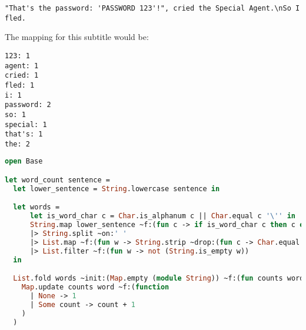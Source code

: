 \begin{verbatim}
"That's the password: 'PASSWORD 123'!", cried the Special Agent.\nSo I fled.
\end{verbatim}

The mapping for this subtitle would be:

\begin{verbatim}
123: 1
agent: 1
cried: 1
fled: 1
i: 1
password: 2
so: 1
special: 1
that's: 1
the: 2
\end{verbatim}

\begin{lstlisting}[language=OCaml]
open Base

let word_count sentence =
  let lower_sentence = String.lowercase sentence in

  let words =
      let is_word_char c = Char.is_alphanum c || Char.equal c '\'' in
      String.map lower_sentence ~f:(fun c -> if is_word_char c then c else ' ')
      |> String.split ~on:' '
      |> List.map ~f:(fun w -> String.strip ~drop:(fun c -> Char.equal c '\'') w)
      |> List.filter ~f:(fun w -> not (String.is_empty w))
  in

  List.fold words ~init:(Map.empty (module String)) ~f:(fun counts word ->
    Map.update counts word ~f:(function
      | None -> 1
      | Some count -> count + 1
    )
  )
\end{lstlisting}